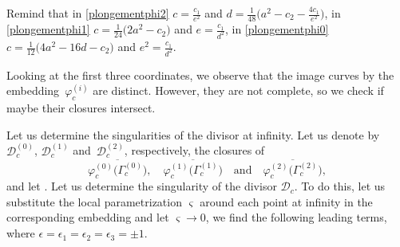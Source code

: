 \documentclass[10pt,a4paper]{amsart}
\numberwithin{equation}{section}
\begin{document}
Remind that in \eqref{plongementphi2} $c=\frac{c_1}{e^2}$ and $d=
\frac{1}{48} \bigl(a^2-c_2-\frac{4c_1}{e^2} \bigr)$, in
\eqref{plongementphi1} $c=\frac{1}{24} \bigl(2a^2-c_2 \bigr)$ and
$e=\frac{c_1}{d^2}$, in \eqref{plongementphi0}
$c=\frac{1}{12} \bigl(4a^2-16d-c_2\big )$ and
$e^2=\frac{c_1}{d^2}$.

Looking at the first three coordinates, we observe that the image
curves by the embedding~$\varphi_c^{ (i )}$ are distinct.
However, they are not complete, so we check if maybe their
closures intersect.

Let us determine the singularities of the divisor at infinity. Let
us denote by $\mathcal{D}_c^{ (0 )}$, $\mathcal{D}_c^{ (1 )}$ and~$\mathcal{D}_c^{(2)}$, respectively, the closures of
\[
\overline{\varphi_c^{ (0 )} \bigl(\Gamma_c^{ (0 )} \bigr)},  \quad \overline{\varphi_c^{ (1 )} \bigl(\Gamma_c^{ (1 )} \bigr)} \quad \text{and} \quad \overline{\varphi_c^{(2)} \bigl(\Gamma_c^{(2)} \bigr)},
 \]
and let . Let us determine the singularity of
the divisor $\mathcal{D}_c$. To do this, let us substitute the local
parametrization $\varsigma$ around each point at infinity in the
corresponding  embedding and let
$\varsigma \rightarrow 0$, we find the following leading terms,
where $\epsilon=\epsilon_1=\epsilon_2=\epsilon_3=\pm 1$.
\end{document}
